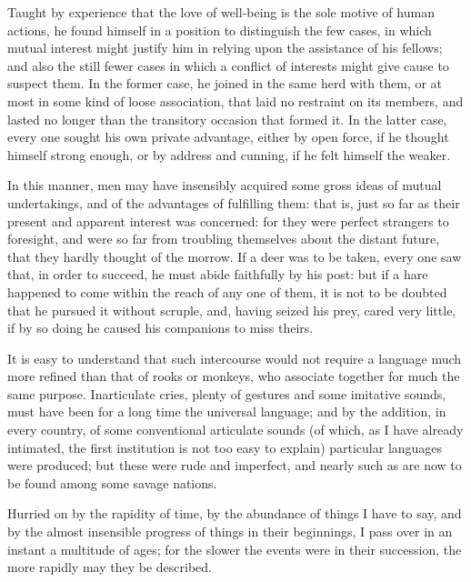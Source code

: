 \documentclass[12pt]{report}
\begin{document}
Taught by experience that the love of well-being is the sole motive of human actions, he found himself in a position to distinguish the few cases, in which mutual interest might justify him in relying upon the assistance of his fellows; and also the still fewer cases in which a conflict of interests might give cause to suspect them. In the former case, he joined in the same herd with them, or at most in some kind of loose association, that laid no restraint on its members, and lasted no longer than the transitory occasion that formed it. In the latter case, every one sought his own private advantage, either by open force, if he thought himself strong enough, or by address and cunning, if he felt himself the weaker.

In this manner, men may have insensibly acquired some gross ideas of mutual undertakings, and of the advantages of fulfilling them: that is, just so far as their present and apparent interest was concerned: for they were perfect strangers to foresight, and were so far from troubling themselves about the distant future, that they hardly thought of the morrow. If a deer was to be taken, every one saw that, in order to succeed, he must abide faithfully by his post: but if a hare happened to come within the reach of any one of them, it is not to be doubted that he pursued it without scruple, and, having seized his prey, cared very little, if by so doing he caused his companions to miss theirs.

It is easy to understand that such intercourse would not require a language much more refined than that of rooks or monkeys, who associate together for much the same purpose. Inarticulate cries, plenty of gestures and some imitative sounds, must have been for a long time the universal language; and by the addition, in every country, of some conventional articulate sounds (of which, as I have already intimated, the first institution is not too easy to explain) particular languages were produced; but these were rude and imperfect, and nearly such as are now to be found among some savage nations.

Hurried on by the rapidity of time, by the abundance of things I have to say, and by the almost insensible progress of things in their beginnings, I pass over in an instant a multitude of ages; for the slower the events were in their succession, the more rapidly may they be described.
\end{document}
